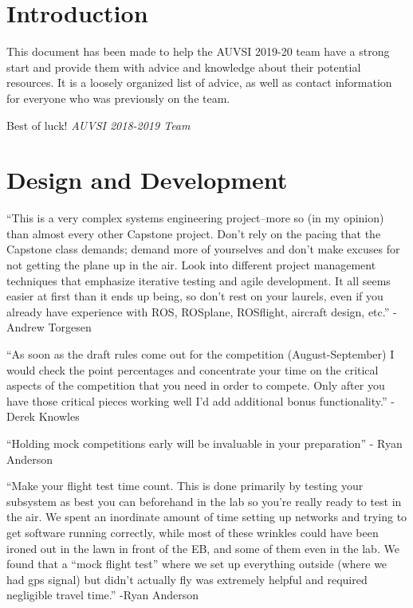 \documentclass[]{auvsi_doc}
\begin{document}
\begin{AUVSITitlePage}
\begin{artifacttable}
\end{artifacttable}
\end{AUVSITitlePage}
\section{Introduction}
This document has been made to help the AUVSI 2019-20 team have a strong start and provide them with advice and knowledge about their potential resources. 
It is a loosely organized list of advice, as well as contact information for everyone who was previously on the team.

Best of luck!
\textit{AUVSI 2018-2019 Team}



\section{Design and Development}
{``This is a very complex systems engineering project--more so (in my
opinion) than almost every other Capstone project. Don't rely on the
pacing that the Capstone class demands; demand more of yourselves and
don't make excuses for not getting the plane up in the air. Look into
different project management techniques that emphasize iterative testing
and agile development. It all seems easier at first than it ends up
being, so don't rest on your laurels, even if you already have
experience with ROS, ROSplane, ROSflight, aircraft design, etc.'' -
Andrew Torgesen}

{}

{``As soon as the draft rules come out for the competition
(August-September) I would check the point percentages and concentrate
your time on the critical aspects of the competition that you need in
order to compete. Only after you have those critical pieces working well
I'd add additional bonus functionality.'' - Derek Knowles}

{}

{``Holding mock competitions early will be invaluable in your
preparation'' - Ryan Anderson}

{}

{``Make your flight test time count. This is done primarily by testing
your subsystem as best you can beforehand in the lab so you're really
ready to test in the air. We spent an inordinate amount of time setting
up networks and trying to get software running correctly, while most of
these wrinkles could have been ironed out in the lawn in front of the
EB, and some of them even in the lab. We found that a ``mock flight
test'' where we set up everything outside (where we had gps signal) but
didn't actually fly was extremely helpful and required negligible travel
time.'' -Ryan Anderson}
\end{document}
